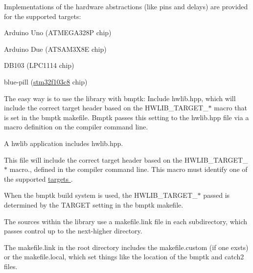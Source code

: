 Implementations of the hardware abstractions (like pins and delays) are provided for the supported targets\+:
\begin{DoxyItemize}
\item Arduino Uno (A\+T\+M\+E\+G\+A328P chip)
\item Arduino Due (A\+T\+S\+A\+M3\+X8E chip)
\item D\+B103 (L\+P\+C1114 chip)
\item blue-\/pill (\hyperlink{namespacestm32f103c8}{stm32f103c8} chip)
\end{DoxyItemize}

The easy way is to use the library with bmptk\+: Include hwlib.\+hpp, which will include the correct target header based on the H\+W\+L\+I\+B\+\_\+\+T\+A\+R\+G\+E\+T\+\_\+$\ast$ macro that is set in the bmptk makefile. Bmptk passes this setting to the hwlib.\+hpp file via a macro definition on the compiler command line.


\begin{DoxyCodeInclude}
\end{DoxyCodeInclude}

\begin{DoxyCodeInclude}
\end{DoxyCodeInclude}

\begin{DoxyCodeInclude}
\end{DoxyCodeInclude}
 A hwlib application includes hwlib.\+hpp.


\begin{DoxyCodeInclude}
\end{DoxyCodeInclude}
 This file will include the correct target header based on the H\+W\+L\+I\+B\+\_\+\+T\+A\+R\+G\+E\+T\+\_\+$\ast$ macro., defined in the compiler command line. This macro must identify one of the supported \hyperlink{targets}{targets }.

When the bmptk build system is used, the H\+W\+L\+I\+B\+\_\+\+T\+A\+R\+G\+E\+T\+\_\+$\ast$ passed is determined by the T\+A\+R\+G\+ET setting in the bmptk makefile.


\begin{DoxyCodeInclude}
\end{DoxyCodeInclude}
 The sources within the library use a makefile.\+link file in each subdirectory, which passes \textquotesingle{}control\textquotesingle{} up to the next-\/higher directory.


\begin{DoxyCodeInclude}
\end{DoxyCodeInclude}
 The makefile.\+link in the root directory includes the makefile.\+custom (if one exsts) or the makefile.\+local, which set things like the location of the bmptk and catch2 files. 